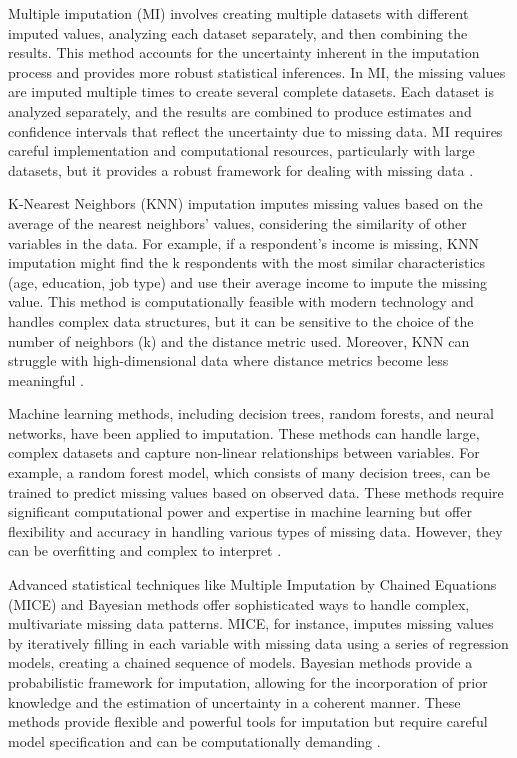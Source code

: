 Multiple imputation (MI) involves creating multiple datasets with different imputed values, analyzing each dataset separately, and then combining the results. This method accounts for the uncertainty inherent in the imputation process and provides more robust statistical inferences. In MI, the missing values are imputed multiple times to create several complete datasets. Each dataset is analyzed separately, and the results are combined to produce estimates and confidence intervals that reflect the uncertainty due to missing data. MI requires careful implementation and computational resources, particularly with large datasets, but it provides a robust framework for dealing with missing data \cite{li2015multiple}.

K-Nearest Neighbors (KNN) imputation imputes missing values based on the average of the nearest neighbors' values, considering the similarity of other variables in the data. For example, if a respondent's income is missing, KNN imputation might find the k respondents with the most similar characteristics (age, education, job type) and use their average income to impute the missing value. This method is computationally feasible with modern technology and handles complex data structures, but it can be sensitive to the choice of the number of neighbors (k) and the distance metric used. Moreover, KNN can struggle with high-dimensional data where distance metrics become less meaningful \cite{pujianto2019k}.

Machine learning methods, including decision trees, random forests, and neural networks, have been applied to imputation. These methods can handle large, complex datasets and capture non-linear relationships between variables. For example, a random forest model, which consists of many decision trees, can be trained to predict missing values based on observed data. These methods require significant computational power and expertise in machine learning but offer flexibility and accuracy in handling various types of missing data. However, they can be overfitting and complex to interpret \cite{stekhoven2012missforest}.

Advanced statistical techniques like Multiple Imputation by Chained Equations (MICE) and Bayesian methods offer sophisticated ways to handle complex, multivariate missing data patterns. MICE, for instance, imputes missing values by iteratively filling in each variable with missing data using a series of regression models, creating a chained sequence of models. Bayesian methods provide a probabilistic framework for imputation, allowing for the incorporation of prior knowledge and the estimation of uncertainty in a coherent manner. These methods provide flexible and powerful tools for imputation but require careful model specification and can be computationally demanding \cite{Buuren2011MICEMI}.

